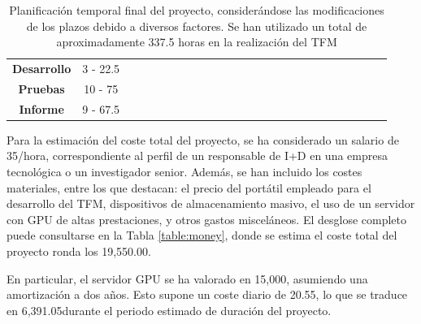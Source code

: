 \begin{table}[h]
{\begin{tabular}{|c|c|ccccccccccccccccccccccc}
    \textbf{Desarrollo} & 3 - 22.5 & \cellcolor[HTML]{FFCCC9} &  & \cellcolor[HTML]{FFCCC9} &  & \cellcolor[HTML]{FFCCC9} &  &  &  &  &  &  &  &  &  &  &  &  &  &  &  &  & \multicolumn{1}{c|}{} &  \\ \cline{1-24}
    \textbf{Pruebas} & 10 - 75 &  & \cellcolor[HTML]{FFCCC9} &  & \cellcolor[HTML]{FFCCC9} &  & \cellcolor[HTML]{FFCCC9} & \cellcolor[HTML]{FFCCC9} & \cellcolor[HTML]{FFCCC9} & \cellcolor[HTML]{FFCCC9} & \cellcolor[HTML]{FFCCC9} & \cellcolor[HTML]{FFCCC9} & \cellcolor[HTML]{FFCCC9} & \cellcolor[HTML]{FFCCC9} &  &  &  &  &  &  &  &  & \multicolumn{1}{c|}{} &  \\ \cline{1-24}
    \textbf{Informe} & 9 - 67.5 &  &  &  &  &  &  &  &  &  &  &  &  &  & \cellcolor[HTML]{FFCCC9} & \cellcolor[HTML]{FFCCC9} & \cellcolor[HTML]{FFCCC9} & \cellcolor[HTML]{FFCCC9} & \cellcolor[HTML]{FFCCC9} & \cellcolor[HTML]{FFCCC9} & \cellcolor[HTML]{FFCCC9} & \cellcolor[HTML]{FFCCC9} & \multicolumn{1}{c|}{\cellcolor[HTML]{FFCCC9}} &  \\ \cline{1-24}
\end{tabular}%
}
\caption[Planificación temporal final del proyecto]{Planificación temporal final del proyecto, considerándose las modificaciones de los plazos debido a diversos factores. Se han utilizado un total de aproximadamente 337.5 horas en la realización del TFM}
\label{table:plan2}
\end{table}

Para la estimación del coste total del proyecto, se ha considerado un salario de 35\officialeuro/hora, correspondiente al perfil de un responsable de I+D en una empresa tecnológica o un investigador senior. Además, se han incluido los costes materiales, entre los que destacan: el precio del portátil empleado para el desarrollo del TFM, dispositivos de almacenamiento masivo, el uso de un servidor con GPU de altas prestaciones, y otros gastos misceláneos. El desglose completo puede consultarse en la Tabla \ref{table:money}, donde se estima el coste total del proyecto ronda los 19,550.00\officialeuro.

En particular, el servidor GPU se ha valorado en 15,000\officialeuro, asumiendo una amortización a dos años. Esto supone un coste diario de 20.55\officialeuro, lo que se traduce en 6,391.05\officialeuro\space durante el periodo estimado de duración del proyecto.

